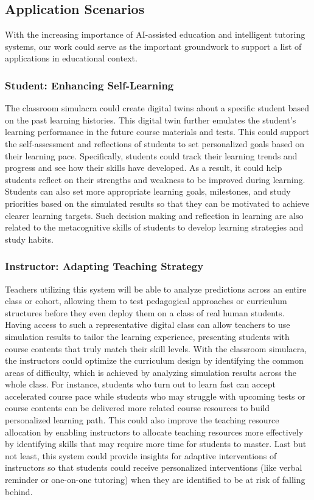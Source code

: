 \subsection{Application Scenarios}

With the increasing importance of AI-assisted education and intelligent tutoring systems, our work could serve as the important groundwork to support a list of applications in educational context.


\subsubsection{Student: Enhancing Self-Learning}
The classroom simulacra could create digital twins about a specific student based on the past learning histories. This digital twin further emulates the student's learning performance in the future course materials and tests. This could support the self-assessment and reflections of students to set personalized goals based on their learning pace. Specifically, students could track their learning trends and progress and see how their skills have developed. As a result, it could help students reflect on their strengths and weakness to be improved during learning. Students can also set more appropriate learning goals, milestones, and study priorities based on the simulated results so that they can be motivated to achieve clearer learning targets. Such decision making and reflection in learning are also related to the metacognitive skills of students to develop learning strategies and study habits.

\subsubsection{Instructor: Adapting Teaching Strategy}
Teachers utilizing this system will be able to analyze predictions across an entire class or cohort, allowing them to test pedagogical approaches or curriculum structures before they even deploy them on a class of real human students. Having access to such a representative digital class can allow teachers to use simulation results to tailor the learning experience, presenting students with course contents that truly match their skill levels.
With the classroom simulacra, the instructors could optimize the curriculum design by identifying the common areas of difficulty, which is achieved by analyzing simulation results across the whole class.
For instance, students who turn out to learn fast can accept accelerated course pace while students who may struggle with upcoming tests or course contents can be delivered more related course resources to build personalized learning path. This could also improve the teaching resource allocation by enabling instructors to allocate teaching resources more effectively by identifying skills that may require more time for students to master. Last but not least, this system could provide insights for adaptive interventions of instructors so that students could receive personalized interventions (like verbal reminder or one-on-one tutoring) when they are identified to be at risk of falling behind. 


